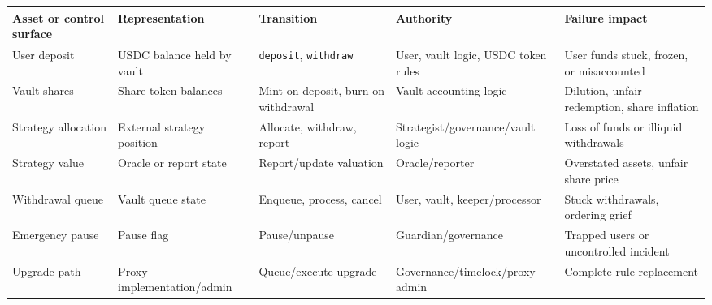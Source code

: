 {\def\LTcaptype{none} %
\begin{longtable}[]{@{}
  >{\raggedright\arraybackslash}p{}
  >{\raggedright\arraybackslash}p{}
  >{\raggedright\arraybackslash}p{}
  >{\raggedright\arraybackslash}p{}
  >{\raggedright\arraybackslash}p{}@{}}
\toprule\noalign{}
\begin{minipage}[b]{\linewidth}\raggedright
Asset or control surface
\end{minipage} & \begin{minipage}[b]{\linewidth}\raggedright
Representation
\end{minipage} & \begin{minipage}[b]{\linewidth}\raggedright
Transition
\end{minipage} & \begin{minipage}[b]{\linewidth}\raggedright
Authority
\end{minipage} & \begin{minipage}[b]{\linewidth}\raggedright
Failure impact
\end{minipage} \\
\midrule\noalign{}
\endhead
\bottomrule\noalign{}
\endlastfoot
User deposit & USDC balance held by vault &
\passthrough{\lstinline!deposit!}, \passthrough{\lstinline!withdraw!} &
User, vault logic, USDC token rules & User funds stuck, frozen, or
misaccounted \\
Vault shares & Share token balances & Mint on deposit, burn on
withdrawal & Vault accounting logic & Dilution, unfair redemption, share
inflation \\
Strategy allocation & External strategy position & Allocate, withdraw,
report & Strategist/governance/vault logic & Loss of funds or illiquid
withdrawals \\
Strategy value & Oracle or report state & Report/update valuation &
Oracle/reporter & Overstated assets, unfair share price \\
Withdrawal queue & Vault queue state & Enqueue, process, cancel & User,
vault, keeper/processor & Stuck withdrawals, ordering grief \\
Emergency pause & Pause flag & Pause/unpause & Guardian/governance &
Trapped users or uncontrolled incident \\
Upgrade path & Proxy implementation/admin & Queue/execute upgrade &
Governance/timelock/proxy admin & Complete rule replacement \\
\end{longtable}
}

